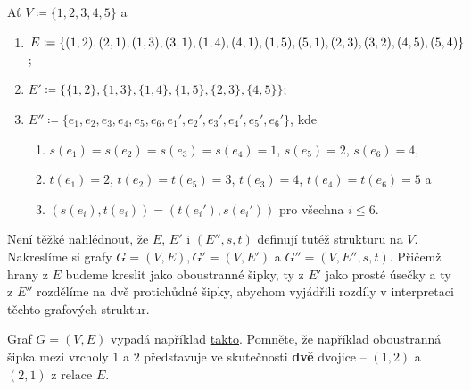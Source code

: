 \begin{example}
 \label{exam:interpretace-grafu}
 Ať $V \coloneqq \{1,2,3,4,5\}$ a 
 \begin{enumerate}
  \item $E \coloneqq
   \{(1,2),(2,1),(1,3),(3,1),(1,4),(4,1),(1,5),(5,1),(2,3),(3,2),\\(4,5),(5,4)\}$;
  \item $E' \coloneqq \{\{1,2\},\{1,3\},\{1,4\},\{1,5\},\{2,3\},\{4,5\}\}$;
  \item $E'' \coloneqq
   \{e_1,e_2,e_3,e_4,e_5,e_6,e_1',e_2',e_3',e_4',e_5',e_6'\}$, kde
   \begin{enumerate}
    \item $s(e_1) = s(e_2) = s(e_3) = s(e_4) = 1$, $s(e_5) = 2$, $s(e_6) = 4$,
    \item $t(e_1) = 2$, $t(e_2) = t(e_5) = 3$, $t(e_3) = 4$, $t(e_4) = t(e_6) =
     5$ a
    \item $(s(e_i),t(e_i)) = (t(e_i'),s(e_i'))$ pro všechna $i \leq 6$.
   \end{enumerate}
 \end{enumerate}

 Není těžké nahlédnout, že $E$, $E'$ i $(E'',s,t)$ definují tutéž strukturu na
 $V$. Nakreslíme si grafy $G = (V,E), G' = (V,E')$ a $G'' = (V,E'',s,t)$.
 Přičemž hrany z $E$ budeme kreslit jako oboustranné šipky, ty z $E'$ jako
 prosté úsečky a ty z $E''$ rozdělíme na dvě protichůdné šipky, abychom
 vyjádřili rozdíly v interpretaci těchto grafových struktur.

 Graf $G = (V,E)$ vypadá například \hyperref[fig:graf-poprve]{takto}. Pomněte,
 že například oboustranná šipka mezi vrcholy $1$ a $2$ představuje ve
 skutečnosti \textbf{dvě} dvojice -- $(1,2)$ a $(2,1)$ z relace $E$.
 \begin{figure}[H]
  \centering
\end{figure}
\end{example}
